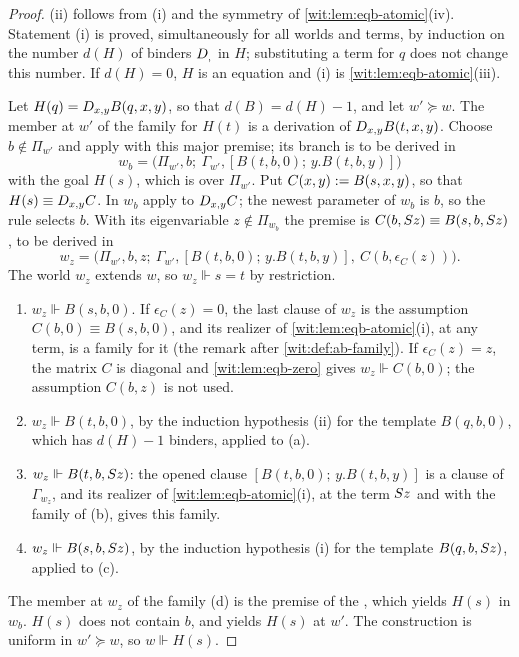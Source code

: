 \begin{proof}
(ii) follows from (i) and the symmetry of \cref{wit:lem:eqb-atomic}(iv).
Statement (i) is proved, simultaneously for all worlds and terms, by
induction on the number $d(H)$ of binders $D_{,}$ in $H$; substituting a
term for $q$ does not change this number.  If $d(H)=0$, $H$ is an equation
and (i) is \cref{wit:lem:eqb-atomic}(iii).

Let $H(q)=D_{x,y}B(q,x,y)$, so that $d(B)=d(H)-1$, and let $w'\succeq w$.
The member at $w'$ of the family for $H(t)$ is a derivation of
$D_{x,y}B(t,x,y)$.  Choose $b\notin\Pi_{w'}$ and apply  with
this major premise; its branch is to be derived in
\[
 w_b=\bigl(\Pi_{w'},b;\ \Gamma_{w'},[B(t,b,0);\,y.B(t,b,y)]\bigr)
\]
with the goal $H(s)$, which is over $\Pi_{w'}$.  Put $C(x,y)\mathrel{:=} B(s,x,y)$,
so that $H(s)\equiv D_{x,y}C$.  In $w_b$ apply  to
$D_{x,y}C$; the newest parameter of $w_b$ is $b$, so the rule selects $b$.
With its eigenvariable $z\notin\Pi_{w_b}$ the premise is $C(b,S z)\equiv
B(s,b,S z)$, to be derived in
\[
 w_z=\bigl(\Pi_{w'},b,z;\ \Gamma_{w'},[B(t,b,0);\,y.B(t,b,y)],\
 C(b,\epsilon_C(z))\bigr).
\]
The world $w_z$ extends $w$, so $w_z\Vdash s=t$ by restriction.
\begin{enumerate}[label=\textup{(\alph*)}]
\item $w_z\Vdash B(s,b,0)$.  If $\epsilon_C(z)=0$, the last clause of $w_z$
 is the assumption $C(b,0)\equiv B(s,b,0)$, and its realizer of
 \cref{wit:lem:eqb-atomic}(i), at any term, is a family for it (the remark
 after \cref{wit:def:ab-family}).  If $\epsilon_C(z)=z$, the
 matrix $C$ is diagonal and \cref{wit:lem:eqb-zero} gives $w_z\Vdash C(b,0)$;
 the assumption $C(b,z)$ is not used.
\item $w_z\Vdash B(t,b,0)$, by the induction hypothesis (ii) for the template
 $B(q,b,0)$, which has $d(H)-1$ binders, applied to (a).
\item $w_z\Vdash B(t,b,S z)$: the opened clause $[B(t,b,0);\,y.B(t,b,y)]$
 is a clause of $\Gamma_{w_z}$, and its realizer of
 \cref{wit:lem:eqb-atomic}(i), at the term $S z$ and with the family of
 (b), gives this family.
\item $w_z\Vdash B(s,b,S z)$, by the induction hypothesis (i) for the
 template $B(q,b,S z)$, applied to (c).
\end{enumerate}
The member at $w_z$ of the family (d) is the premise of the
, which yields $H(s)$ in $w_b$.  $H(s)$ does not contain $b$,
and \rulename{Open} yields $H(s)$ at $w'$.  The construction is uniform in
$w'\succeq w$, so $w\Vdash H(s)$.


\end{proof}
